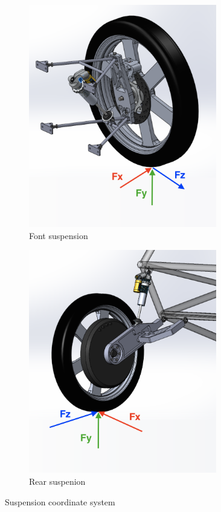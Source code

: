 \documentclass[10pt]{article}
\begin{document}
\begin{figure}[hbp]
\centering
\begin{subfigure}[b]{.48\textwidth}
\centering
\includegraphics[width=0.9\textwidth]{figures/front-axis-directions}
\caption{Font suspension}
\end{subfigure}
\begin{subfigure}[b]{.48\textwidth}
\centering
\includegraphics[width=0.9\textwidth]{figures/rear-axis-directions}
\caption{Rear suspenion}
\end{subfigure}
\caption{Suspension coordinate system}
\label{fig:suspension-coordinate-system}
\end{figure}
\end{document}
